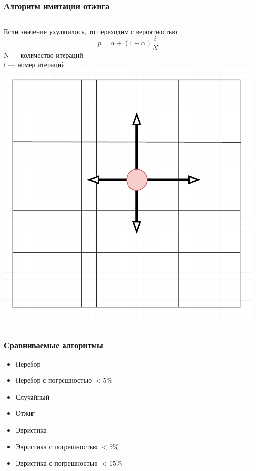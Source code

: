 \documentclass{beamer}
\begin{document}
\begin{frame}
\frametitle{Алгоритм имитации отжига}
\begin{columns}
    Если значение ухудшилось, то переходим с вероятностью
    \[
    p=\alpha + (1 - \alpha) \frac{i}{N}
    \]
    N --- количество итераций\\
    i --- номер итераций
    \includegraphics[width=\textwidth]{gena_move.png}
\end{columns}
\end{frame}

\begin{frame}
    \frametitle{Сравниваемые алгоритмы}
    \begin{itemize}
            \item Перебор
            \item Перебор с погрешностью $<5\%$
            \item Случайный
            \item Отжиг
            \item Эвристика
            \item Эвристика с погрешностью $<5\%$
            \item Эвристика с погрешностью $<15\%$
    \end{itemize}
\end{frame}
\end{document}

